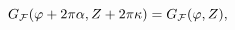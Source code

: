\begin{equation}
G_{{\cal F}}(\varphi+2\pi\alpha, Z+2\pi\kappa)=
G_{{\cal F}}(\varphi,Z),
\label{bc1}
\end{equation}

